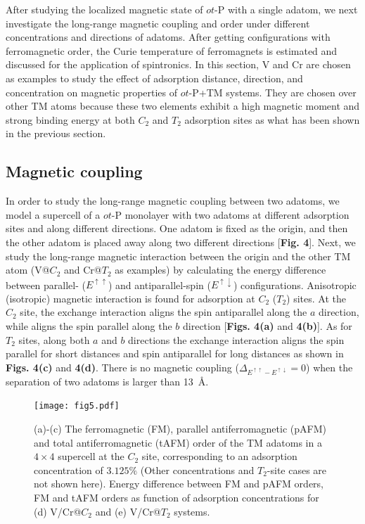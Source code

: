 \documentclass[%
superscriptaddress,
preprint,
showpacs,preprintnumbers,
 amsmath,amssymb,
prb,
]{revtex4-1}
\begin{document}
After studying the localized magnetic state of $ot$-P with a single adatom, we next investigate the long-range magnetic coupling and order under different concentrations and directions of adatoms. After getting configurations with ferromagnetic order, the Curie temperature of ferromagnets is estimated and discussed for the application of spintronics. In this section, V and Cr are chosen as examples to study the effect of adsorption distance, direction, and concentration on magnetic properties of $ot$-P+TM systems. They are chosen over other TM atoms because these two elements exhibit
a high magnetic moment and strong binding energy at both $C_{2}$ and $T_{2}$ adsorption
sites as what has been shown in the previous section.

\subsection{Magnetic coupling}

In order to study the long-range magnetic coupling between two adatoms, we model a supercell of a $ot$-P monolayer with two adatoms at different adsorption sites and along different directions. One adatom is fixed as the origin, and then the other adatom is placed away along two different directions [\textbf{Fig. 4}]. Next, we study the long-range magnetic interaction between the origin and the other TM atom (V@$C_2$ and Cr@$T_2$ as examples) by calculating the energy difference between parallel- ($E^{\uparrow\uparrow}$) and antiparallel-spin ($E^{\uparrow\downarrow}$) configurations. Anisotropic (isotropic) magnetic interaction is found for adsorption at $C_2$ ($T_2$) sites. At the $C_2$ site, the exchange interaction aligns the spin antiparallel along the $a$ direction, while aligns the spin parallel along the $b$ direction [\textbf{Figs. 4(a)} and \textbf{4(b)}]. As for $T_2$ sites, along both $a$ and $b$ directions the exchange interaction aligns the spin parallel for short distances and spin antiparallel for long distances as shown in \textbf{Figs. 4(c)} and \textbf{4(d)}. There is no magnetic coupling ($\Delta_{E^{\uparrow\uparrow}-E^{\uparrow\downarrow}}=0$) when the separation of two adatoms is larger than 13~\AA.
\begin{figure}[ptb]
\centering
\texttt{[image: fig5.pdf]}
\caption{{\footnotesize{}(a)-(c) The ferromagnetic (FM), parallel antiferromagnetic
(pAFM) and total antiferromagnetic (tAFM) order of the
TM adatoms in a $4\times4$ supercell at the $C_2$ site, corresponding to an adsorption
concentration of $3.125\%$ (Other concentrations and $T_2$-site cases are not shown here). Energy difference between FM and pAFM orders, FM and tAFM orders as function of adsorption concentrations
for (d) V/Cr@$C_2$ and (e) V/Cr@$T_2$ systems.\label{FM-AFM-Ediff}}}
\end{figure}
\end{document}
